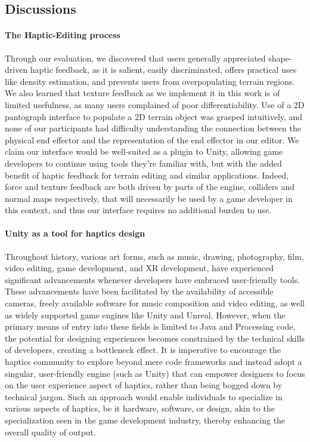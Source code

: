 \subsection{Discussions}

\paragraph{The Haptic-Editing process}

Through our evaluation, we discovered that users generally appreciated shape-driven haptic feedback, as it is salient, easily discriminated, offers practical uses like density estimation, and prevents users from overpopulating terrain regions. We also learned that texture feedback as we implement it in this work is of limited usefulness, as many users complained of poor differentiability. Use of a 2D pantograph interface to populate a 2D terrain object was grasped intuitively, and none of our participants had difficulty understanding the connection between the physical end effector and the representation of the end effector in our editor. We claim our interface would be well-suited as a plugin to Unity, allowing game developers to continue using tools they're familiar with, but with the added benefit of haptic feedback for terrain editing and similar applications. Indeed, force and texture feedback are both driven by parts of the engine, colliders and normal maps respectively, that will necessarily be used by a game developer in this context, and thus our interface requires no additional burden to use. 

\paragraph{Unity as a tool for haptics design}

Throughout history, various art forms, such as music, drawing, photography, film, video editing, game development, and XR development, have experienced significant advancements whenever developers have embraced user-friendly tools. These advancements have been facilitated by the availability of accessible cameras, freely available software for music composition and video editing, as well as widely supported game engines like Unity and Unreal. However, when the primary means of entry into these fields is limited to Java and Processing code, the potential for designing experiences becomes constrained by the technical skills of developers, creating a bottleneck effect. It is imperative to encourage the haptics community to explore beyond mere code frameworks and instead adopt a singular, user-friendly engine (such as Unity) that can empower designers to focus on the user experience aspect of haptics, rather than being bogged down by technical jargon. Such an approach would enable individuals to specialize in various aspects of haptics, be it hardware, software, or design, akin to the specialization seen in the game development industry, thereby enhancing the overall quality of output.

